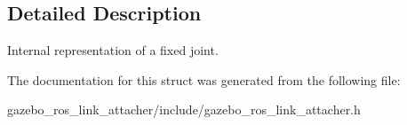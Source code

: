 \subsection{Detailed Description}
Internal representation of a fixed joint. 

The documentation for this struct was generated from the following file\+:\begin{DoxyCompactItemize}
\item 
gazebo\+\_\+ros\+\_\+link\+\_\+attacher/include/gazebo\+\_\+ros\+\_\+link\+\_\+attacher.\+h\end{DoxyCompactItemize}
